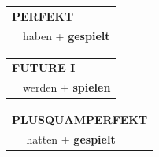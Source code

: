 \documentclass[10pt,a4paper]{revtex4-2}
\begin{document}
\begin{verbbox-acc}
    \vspace{10pt}

 \begin{tabular}{rl}
     \multicolumn{2}{l}{\textbf{PERFEKT}}\\
   & haben + \textbf{gespielt}\\
  \end{tabular}
\hfill
   \begin{tabular}{rl}
   
    \multicolumn{2}{l}{\textbf{FUTURE I} }\\
  &  werden + \textbf{spielen}\\
 
  \end{tabular}
\hfill
   \begin{tabular}{rl}
      \multicolumn{2}{l}{\textbf{PLUSQUAMPERFEKT}}\\
   & hatten + \textbf{gespielt}\\
  \end{tabular}
  
  \vspace{-5pt}


\end{verbbox-acc}
\end{document}
